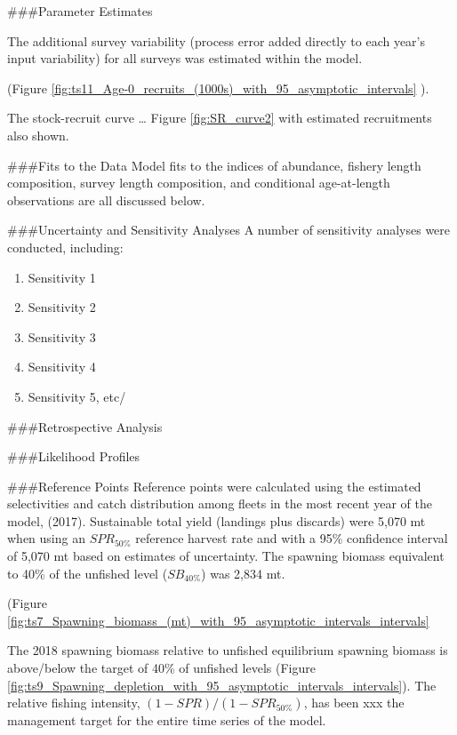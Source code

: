 \documentclass[12pt,]{article}
\begin{document}
\#\#\#Parameter Estimates

The additional survey variability (process error added directly to each
year's input variability) for all surveys was estimated within the
model.

(Figure
\ref{fig:ts11_Age-0_recruits_(1000s)_with_95_asymptotic_intervals} ).

The stock-recruit curve \ldots{} Figure \ref{fig:SR_curve2} with
estimated recruitments also shown.

\#\#\#Fits to the Data Model fits to the indices of abundance, fishery
length composition, survey length composition, and conditional
age-at-length observations are all discussed below.

\#\#\#Uncertainty and Sensitivity Analyses A number of sensitivity
analyses were conducted, including:

\begin{enumerate}

  \item Sensitivity 1
  
  \item Sensitivity 2
  
  \item Sensitivity 3
  
  \item Sensitivity 4
  
  \item Sensitivity 5, etc/
  
  
\end{enumerate}

\#\#\#Retrospective Analysis

\#\#\#Likelihood Profiles

\#\#\#Reference Points Reference points were calculated using the
estimated selectivities and catch distribution among fleets in the most
recent year of the model, (2017). Sustainable total yield (landings plus
discards) were 5,070 mt when using an \(SPR_{50\%}\) reference harvest
rate and with a 95\% confidence interval of 5,070 mt based on estimates
of uncertainty. The spawning biomass equivalent to 40\% of the unfished
level (\(SB_{40\%}\)) was 2,834 mt.

(Figure
\ref{fig:ts7_Spawning_biomass_(mt)_with_95_asymptotic_intervals_intervals}

The 2018 spawning biomass relative to unfished equilibrium spawning
biomass is above/below the target of 40\% of unfished levels (Figure
\ref{fig:ts9_Spawning_depletion_with_95_asymptotic_intervals_intervals}).
The relative fishing intensity, \((1-SPR)/(1-SPR_{50\%})\), has been xxx
the management target for the entire time series of the model.
\end{document}
